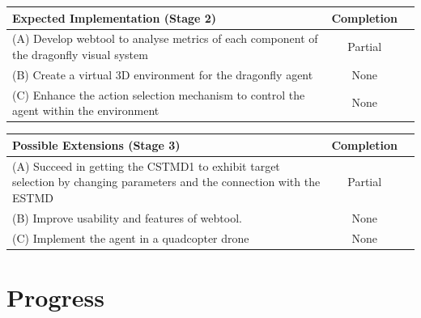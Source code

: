 \documentclass[a4paper,11pt]{article}
\begin{document}
\begin{center}
    \begin{tabular}{p{12cm} c c}
    \textbf{Expected Implementation (Stage 2)} & \textbf{Completion} \\ \hline
	(A) Develop webtool to analyse metrics of each component of the dragonfly visual system & Partial \\
	(B) Create a virtual 3D environment for the dragonfly agent & None\\
	(C) Enhance the action selection mechanism to control the agent within the environment & None\\
    \end{tabular}
\end{center}

\begin{center}
    \begin{tabular}{p{12cm} c c}
    \textbf{Possible Extensions (Stage 3)} & \textbf{Completion} \\ \hline
	(A) Succeed in getting the CSTMD1 to exhibit target selection by changing parameters and the connection with the ESTMD & Partial\\
	(B) Improve usability and features of webtool. & None\\
	(C) Implement the agent in a quadcopter drone & None\\
    \end{tabular}
\end{center}


\section{Progress}
\end{document}
